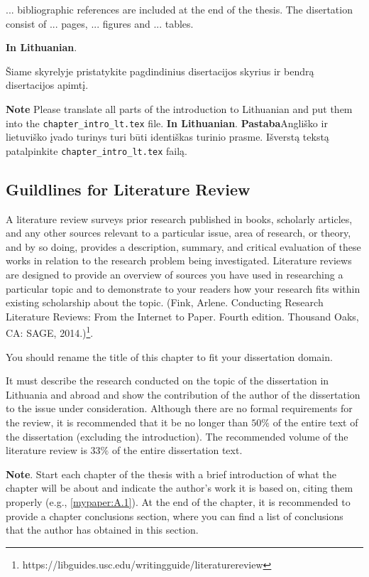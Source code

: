 ... bibliographic references are included at the end of the thesis. The disertation consist of ... pages, ... figures and ... tables.


\textbf{In Lithuanian}. 

Šiame skyrelyje pristatykite pagdindinius disertacijos skyrius ir bendrą disertacijos apimtį.



\textbf{Note} Please translate all parts of the introduction to Lithuanian and put them into the \verb|chapter_intro_lt.tex| file.
\textbf{In Lithuanian}. \textbf{Pastaba}Angliško ir lietuviško įvado turinys turi būti identiškas turinio prasme. Išverstą tekstą patalpinkite \verb|chapter_intro_lt.tex| failą.

\subsection{Guildlines for Literature Review}

A literature review surveys prior research published in books, scholarly articles, and any other sources relevant to a particular issue, area of research, or theory, and by so doing, provides a description, summary, and critical evaluation of these works in relation to the research problem being investigated. Literature reviews are designed to provide an overview of sources you have used in researching a particular topic and to demonstrate to your readers how your research fits within existing scholarship about the topic.  (Fink, Arlene. Conducting Research Literature Reviews: From the Internet to Paper. Fourth edition. Thousand Oaks, CA: SAGE, 2014.)\footnote{https://libguides.usc.edu/writingguide/literaturereview}. 

You should rename the title of this chapter to fit your dissertation domain. 

It must describe the research conducted on the topic of the dissertation in Lithuania and abroad and show the contribution of the author of the dissertation to the issue under consideration.
Although there are no formal requirements for the review, it is recommended that it be no longer than $50\%$ of the entire text of the dissertation (excluding the introduction). The recommended volume of the literature review is $33\%$ of the entire dissertation text.

\textbf{Note}. Start each chapter of the thesis with a brief introduction of what the chapter will be about and indicate the author's work it is based on, citing them properly (e.g., \ref{mypaper:A.1}). At the end of the chapter, it is recommended to provide a chapter conclusions section, where you can find a list of conclusions that the author has obtained in this section.


